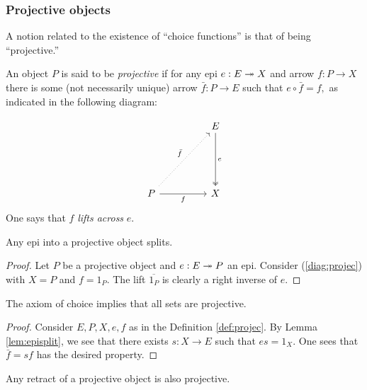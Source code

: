 \subsubsection{Projective objects}
A notion related to the existence of ``choice functions'' is that of being ``projective.''
\begin{defn} \label{def:projec}
	An object $P$ is said to be \emph{projective} if for any epi $e:E\twoheadrightarrow X$ and arrow $f:P\to X$ there is some (not necessarily unique) arrow $\bar{f}:P \to E$ such that $e\circ \bar{f} = f,$ as indicated in the following diagram:
\end{defn}
\begin{equation} \label{diag:projec}
	\begin{tikzcd}
		&  & E \arrow[ddd, "e", two heads] \\&&\\&&\\
		P \arrow[rr, "f"'] \arrow[rruuu, "\bar{f}", dotted] &  & X
	\end{tikzcd}
\end{equation}
One says that $f$ \emph{lifts across} $e.$
\begin{prop}
	Any epi into a projective object splits.
\end{prop}
\begin{proof} 
	Let $P$ be a projective object and $e:E \twoheadrightarrow P$ an epi. Consider (\ref{diag:projec}) with $X = P$ and $f = 1_P.$ The lift $\overline{1_P}$ is clearly a right inverse of $e.$
\end{proof}
\begin{prop}
	The axiom of choice implies that all sets are projective.
\end{prop}
\begin{proof} 
	Consider $E, P, X, e, f$ as in the Definition \ref{def:projec}. By Lemma \ref{lem:episplit}, we see that there exists $s:X \to E$ such that $es = 1_X.$ One sees that $\bar{f} = sf$ has the desired property.
\end{proof}
\begin{prop}
	Any retract of a projective object is also projective.
\end{prop}
